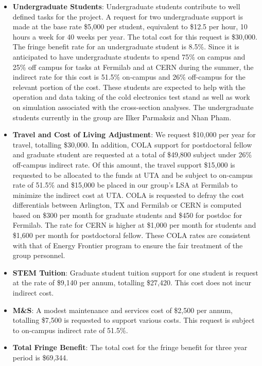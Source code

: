 \begin{enumerate}
\begin{itemize}[noitemsep,nolistsep]
\item {{\bf Undergraduate Students}: Undergraduate students contribute to well defined tasks for the project.  A request for two undergraduate support is made at the base rate \$5,000 per student, equivalent to \$12.5 per hour, 10 hours a week for 40 weeks per year.  The total cost for this request is \$30,000.  The fringe benefit rate for an undergraduate student is 8.5\%.  Since it is anticipated to have undergraduate students to spend 75\% on campus and 25\% off campus for tasks at Fermilab and at CERN during the summer, the indirect rate for this cost is 51.5\% on-campus and 26\% off-campus for the relevant portion of the cost. These students are expected to help with the operation and data taking of the cold electronics test stand as well as work on simulation associated with the cross-section analyses. The undergraduate students currently in the group are Ilker Parmaksiz and Nhan Pham.}

\item{{\bf Travel and Cost of Living Adjustment}: We request \$10,000 per year for travel, totalling \$30,000.  In addition, COLA support for postdoctoral fellow and graduate student are requested at a total of \$49,800 subject under 26\% off-campus indirect rate.  Of this amount, the travel support \$15,000 is requested to be allocated to the funds at UTA and be subject to on-campus rate of 51.5\% and \$15,000 be placed in our group’s LSA at Fermilab to minimize the indirect cost at UTA. COLA is requested to defray the cost differentials between Arlington, TX and Fermilab or CERN is computed based on \$300 per month for graduate students and \$450 for postdoc for Fermilab.  The rate for CERN is higher at \$1,000 per month for students and \$1,600 per month for postdoctoral fellow.  These COLA rates are consistent with that of Energy Frontier program to ensure the fair treatment of the group personnel.}

\item {{\bf STEM Tuition}: Graduate student tuition support for one student is request at the rate of \$9,140 per annum, totalling \$27,420.  This cost does not incur indirect cost.}

\item {{\bf M\&S}: A modest maintenance and services cost of \$2,500 per annum, totalling \$7,500 is requested to support various costs.   This request is subject to on-campus indirect rate of 51.5\%.}

\item {{\bf Total Fringe Benefit}: The total cost for the fringe benefit for three year period is \$69,344.}


\end{itemize}
\end{enumerate}
